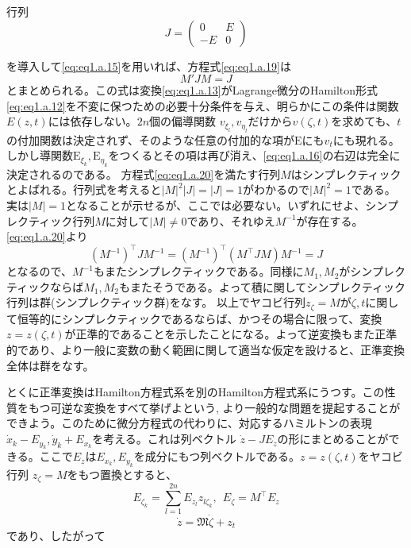 \documentclass[dvipdfmx, leqno]{jsbook}
\begin{document}
    行列
\begin{equation}
    J= \begin{pmatrix}0 & E\\ -E& 0\end{pmatrix}
\end{equation}

    を導入して\eqref{eq:eq1.a.15}を用いれば、方程式\eqref{eq:eq1.a.19}は
\begin{equation} \label{eq:eq1.a.20}
    M'JM= J
\end{equation}
    とまとめられる。この式は変換\eqref{eq:eq1.a.13}がLagrange微分のHamilton形式\eqref{eq:eq1.a.12}を不変に保つための必要十分条件を与え、明らかにこの条件は関数$E(z, t)$には依存しない。$2n$個の偏導関数 $v_{\xi_l}, v_{\eta_l}$だけから$v(\zeta, t)$を求めても、$t$の付加関数は決定されず、そのような任意の付加的な項が$\mathrm{E}$にも$v_t$にも現れる。しかし導関数$\mathrm{E}_{\xi_k}, \mathrm{E}_{\eta_k}$をつくるとその項は再び消え、\eqref{eq:eq1.a.16}の右辺は完全に決定されるのである。
    方程式\eqref{eq:eq1.a.20}を満たす行列$M$はシンプレクティックとよばれる。行列式を考えると$|M|^2 |J|= |J|= 1$がわかるので$|M|^2= 1$である。実は$|M|= 1$となることが示せるが、ここでは必要ない。いずれにせよ、シンプレクティック行列$M$に対して$|M|\neq 0$であり、それゆえ$M^{-1}$が存在する。\eqref{eq:eq1.a.20}より
\begin{equation}
    (M^{-1})^{\top}J M^{-1}= (M^{-1})^{\top} (M^{\top}JM) M^{-1}= J
\end{equation}
    となるので、$M^{-1}$もまたシンプレクティックである。同様に$M_1, M_2$がシンプレクティックならば$M_1, M_2$もまたそうである。よって積に関してシンプレクティック行列は群(シンプレクティック群)をなす。
    以上でヤコビ行列$z_\zeta= M$が$\zeta, t$に関して恒等的にシンプレクティックであるならば、かつその場合に限って、変換$z= z(\zeta, t)$が正準的であることを示したことになる。よって逆変換もまた正準的であり、より一般に変数の動く範囲に関して適当な仮定を設けると、正準変換全体は群をなす。

    とくに正準変換はHamilton方程式系を別のHamilton方程式系にうつす。この性質をもつ可逆な変換をすべて挙げよという, より一般的な問題を提起することができよう。このために微分方程式の代わりに、対応するハミルトンの表現$\dot{x}_k- E_{y_k}, \dot{y}_k+ E_{x_k}$を考える。これは列ベクトル $\dot{z}- JE_z$の形にまとめることができる。ここで$E_z$は$E_{x_k}, E_{y_k}$を成分にもつ列ベクトルである。$z= z(\zeta, t)$をヤコビ行列 $z_\zeta= M$をもつ置換とすると、
\begin{equation}
    E_{\zeta_k}= \sum_{l= 1}^{2n} E_{z_l} z_{l\zeta_k}, \ \ E_\zeta= M^{\top} E_z
\end{equation}
\begin{equation} \label{eq:eq1.a.21}
    \dot{z} = \mathfrak{M}\dot{\zeta} + z_t
\end{equation}
    であり、したがって
\end{document}
